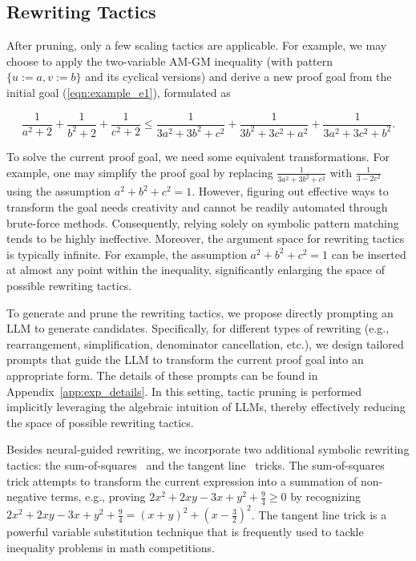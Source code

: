 \vspace{-0.3em}
\subsection{Rewriting Tactics}
\vspace{-0.3em}
After pruning, only a few scaling tactics are applicable. For example, we may choose to apply the two-variable AM-GM inequality (with pattern $\{u := a, v := b\}$ and its cyclical versions) and derive a new proof goal from the initial goal (\ref{eqn:example_e1}), formulated as
\begin{tcolorbox}[enhanced, colback=black!5!white, colframe=black!75!white, top=-4pt, bottom=2pt, left=2pt, right=2pt,]
\begin{equation*} \label{eqn:example_e3} \tag{3}
\frac{1}{a^2+2}+\frac{1}{b^2+2}+\frac{1}{c^2+2} \leq \frac{1}{3a^2+3b^2+c^2}+\frac{1}{3b^2+3c^2+a^2}+\frac{1}{3a^2+3c^2+b^2}. 
\end{equation*}
\end{tcolorbox}


To solve the current proof goal, we need some equivalent transformations. For example, one may simplify the proof goal by replacing $\frac{1}{3a^2+3b^2+c^2}$ with $\frac{1}{3 - 2c^2}$ using the assumption $a^2 + b^2 + c^2 = 1$. However, figuring out effective ways to transform the goal needs creativity and cannot be readily automated through brute-force methods. Consequently, relying solely on symbolic pattern matching tends to be highly ineffective. Moreover, the argument space for rewriting tactics is typically infinite. For example, the assumption $a^2 + b^2 + c^2 = 1$ can be inserted at almost any point within the inequality, significantly enlarging the space of possible rewriting tactics.

To generate and prune the rewriting tactics, we propose directly prompting an LLM to generate candidates. Specifically, for different types of rewriting (e.g., rearrangement, simplification, denominator cancellation, etc.), we design tailored prompts that guide the LLM to transform the current proof goal into an appropriate form. 
The details of these prompts can be found in Appendix~\ref{app:exp_details}.
In this setting, tactic pruning is performed implicitly leveraging the algebraic intuition of LLMs, thereby effectively reducing the space of possible rewriting tactics.

Besides neural-guided rewriting, we incorporate two additional symbolic rewriting tactics: the sum-of-squares~\citep{chen2013supersums} and the tangent line~\citep{li2005using} tricks. The sum-of-squares trick attempts to transform the current expression into a summation of non-negative terms, e.g., proving $2x^2 + 2xy - 3x + y^2 + \frac{9}{4} \ge 0$ by recognizing $2x^2 + 2xy - 3x + y^2 + \frac{9}{4} = (x + y) ^ 2 + (x - \frac{3}{2})^2$. The tangent line trick is a powerful variable substitution technique that is frequently used to tackle inequality problems in math competitions.
